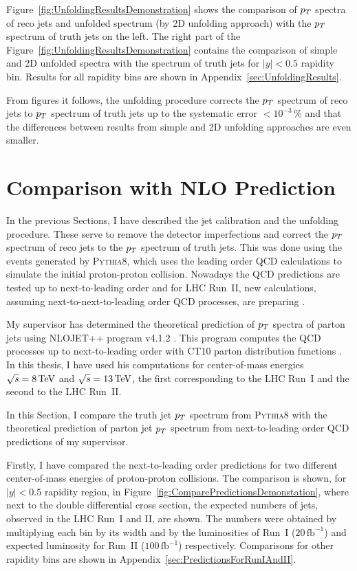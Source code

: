 Figure~\ref{fig:UnfoldingResultsDemonstration} shows the comparison of $p_{T}$
spectra of reco jets and unfolded spectrum (by 2D unfolding approach) with the
$p_{T}$ spectrum of truth jets on the left. The right part of the
Figure~\ref{fig:UnfoldingResultsDemonstration} contains the comparison of simple and 2D unfolded
spectra with the spectrum of truth jets for $|y|<0.5$ rapidity bin.
Results for all rapidity bins are shown in Appendix~\ref{sec:UnfoldingResults}.

From figures it follows, the unfolding procedure corrects the
$p_{T}$ spectrum of reco jets to $p_{T}$ spectrum of truth jets up to the systematic
error $<10^{-3}\,\%$ and that the differences between results from simple and 2D
unfolding approaches are even smaller.

\section{Comparison with NLO Prediction}
\label{sec:ComaprisonWithNLOPrediction}

In the previous Sections, I have described the jet calibration and the unfolding
procedure. These serve to remove the detector imperfections and correct the
$p_{T}$ spectrum of reco jets to the $p_{T}$ spectrum of truth jets. This was done using the
events generated by \textsc{Pythia8}, which uses
the leading order QCD calculations to simulate the initial proton-proton collision.
Nowadays the QCD predictions are tested up to next-to-leading order and for
LHC Run~II, new calculations, assuming next-to-next-to-leading order QCD
processes, are preparing \cite{NNLO1,NNLO2}.

My supervisor has determined the theoretical prediction of $p_{T}$ spectra of
parton jets using \textsc{NLOJET++} program v4.1.2 \cite{NLOJetProgram}. This
program computes the QCD processes up to next-to-leading order with CT10
parton distribution functions \cite{CT10PDF, Annecy}. In this thesis, I have used
his computations for center-of-mass energies $\sqrt{s}=8\,\text{TeV}$ and
$\sqrt{s}=13\,\text{TeV}$, the first corresponding to the LHC Run~I and the second to
the LHC Run~II. 

In this Section, I compare the truth jet $p_{T}$ spectrum from \textsc{Pythia8}
with the theoretical prediction of parton jet $p_{T}$ spectrum from
next-to-leading order QCD predictions of my supervisor.

Firstly, I have compared the next-to-leading order predictions for two different
center-of-mass energies of proton-proton collisions.
The comparison is shown, for $|y|<0.5$ rapidity region, in
Figure~\ref{fig:ComparePredictionsDemonstation}, where next to the double differential
cross section, the expected numbers of jets, observed in the LHC Run~I and II,
are shown. The numbers were obtained by multiplying each bin by its width and
by the luminosities of Run~I ($20\,\text{fb}^{-1}$) and expected luminosity for 
Run~II ($100\,\text{fb}^{-1}$) respectively. Comparisons for other rapidity bins
are shown in Appendix~\ref{sec:PredictionsForRunIAndII}.

